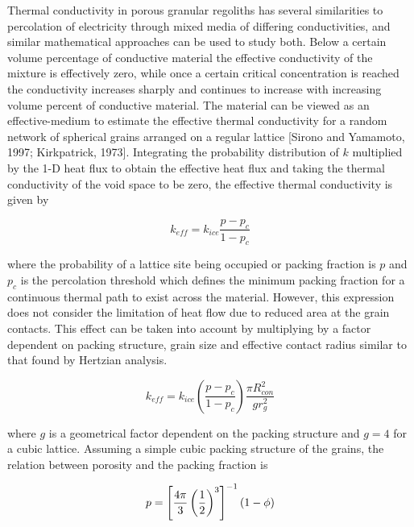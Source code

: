 \documentclass[11pt]{article} %
\begin{document}
	Thermal conductivity in porous granular regoliths has several similarities to percolation of electricity through mixed media of differing conductivities, and similar mathematical approaches can be used to study both. Below a certain volume percentage of conductive material the effective conductivity of the mixture is effectively zero, while once a certain critical concentration is reached the conductivity increases sharply and continues to increase with increasing volume percent of conductive material. The material can be viewed as an effective-medium to estimate the effective thermal conductivity for a random network of spherical grains arranged on a regular lattice  [Sirono and Yamamoto, 1997; Kirkpatrick, 1973]. Integrating the probability distribution of $k$ multiplied by the 1-D heat flux to obtain the effective heat flux and taking the thermal conductivity of the void space to be zero, the effective thermal conductivity is given by
	
	\begin{equation}
	k_{eff} = k_{ice} \frac{p - p_{c}}{1 - p_{c}}
	\end{equation}

	where the probability of a lattice site being occupied or packing fraction is $p$ and $p_{c}$ is the percolation threshold which defines the minimum packing fraction for a continuous thermal path to exist across the material. However, this expression does not consider the limitation of heat flow due to reduced area at the grain contacts. This effect can be taken into account by multiplying by a factor dependent on packing structure, grain size and effective contact radius similar to that found by Hertzian analysis.
	 
	\begin{equation}
	k_{eff} = k_{ice} ( \frac{p - p_{c}}{1-p_{c}} )\frac{\pi R_{con}^{2}}{g r_{g}^{2}}
	\end{equation}

	where $g$ is a geometrical factor dependent on the packing structure and $g = 4$ for a cubic lattice. Assuming a simple cubic packing structure of the grains, the relation between porosity and the packing fraction is
	
	\begin{equation}
	p = \left[ \frac{4 \pi}{3} \left( \frac{1}{2} \right)^{3} \right]^{-1} (1 - \phi) \\
	\end{equation}
	
\end{document}

